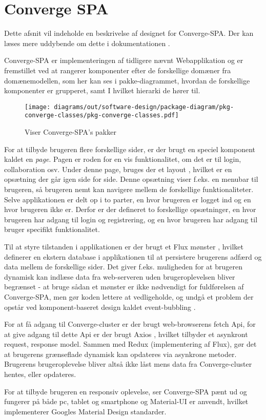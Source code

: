 \section{Converge SPA}

Dette afsnit vil indeholde en beskrivelse af designet for Converge-SPA. Der kan læses mere uddybende om dette i dokumentationen \cite[Converge-SPA]{software-design}.

Converge-SPA er implementeringen af tidligere nævnt Webapplikation og er fremstillet ved at rangerer komponenter efter de forskellige domæner fra domænemodellen, som her kan ses i pakke-diagrammet, hvordan de forskellige komponenter er grupperet, samt I hvilket hierarki de hører til.


\begin{figure}[H]
    \centering
\texttt{[image: diagrams/out/software-design/package-diagram/pkg-converge-classes/pkg-converge-classes.pdf]}
\caption{Viser Converge-SPA's pakker}
\label{fig:packagediagram}
\end{figure}

For at tilbyde brugeren flere forskellige sider, er der brugt en speciel komponent kaldet en \emph{page}. Pagen er roden for en vis 
funktionalitet, om det er til login, collaboration osv. Under denne page, bruges der et layout \cite[Layout]{converge-terms}, hvilket er en opsætning der går igen side for side. Denne opsætning viser f.eks. en menubar til brugeren, så brugeren nemt kan navigere mellem de forskellige funktionaliteter. Selve applikationen er delt op i to parter, en hvor brugeren er logget ind og en hvor brugeren ikke er. Derfor er der defineret to forskellige opsætninger, en hvor brugeren har adgang til login og registrering, og en hvor brugeren har adgang til bruger specifikt funktionalitet.

Til at styre tilstanden i applikationen er der brugt et Flux mønster \cite{Flux-pattern}, hvilket definerer en ekstern database i applikationen til at persistere brugerens adfærd og data mellem de forskellige sider. Det giver f.eks. muligheden for at brugeren dynamisk kan indlæse data fra web-serveren uden brugeroplevelsen bliver begrænset - at bruge sådan et mønster er ikke nødvendigt for fuldførelsen af Converge-SPA, men gør koden lettere at vedligeholde, og undgå et problem der opstår ved komponent-baseret design kaldet event-bubbling \cite[Event-bubbling]{converge-terms}.

For at få adgang til Converge-cluster er der brugt web-browserens fetch Api, for at give adgang til dette Api er der brugt Axios \cite{Axios}, hvilket tilbyder et asynkront request, response model. Sammen med Redux (implementering af Flux), gør det at brugerens grænseflade dynamisk kan opdateres via asynkrone metoder. Brugerens brugeroplevelse bliver altså ikke låst mens data fra Converge-cluster hentes, eller opdateres.

For at tilbyde brugeren en responsiv oplevelse, ser Converge-SPA pænt ud og fungerer på både pc, tablet og smartphone og Material-UI \cite[Material-UI]{converge-terms} er anvendt, hvilket implementerer Googles Material Design standarder.

